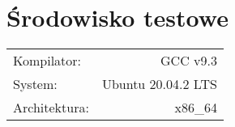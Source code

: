 \section{Środowisko testowe}
\begin{tabular}{l r}
  Kompilator:   & GCC v9.3\\
  System:       & Ubuntu 20.04.2 LTS\\
  Architektura: & x86\_64
\end{tabular}
